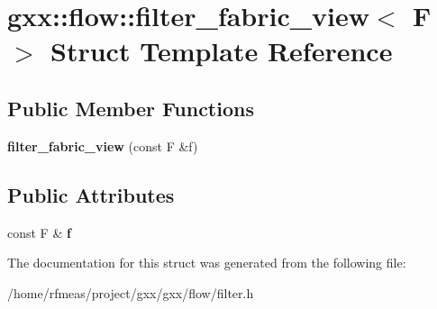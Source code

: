 \hypertarget{structgxx_1_1flow_1_1filter__fabric__view}{}\section{gxx\+:\+:flow\+:\+:filter\+\_\+fabric\+\_\+view$<$ F $>$ Struct Template Reference}
\label{structgxx_1_1flow_1_1filter__fabric__view}
\subsection*{Public Member Functions}
\begin{DoxyCompactItemize}
\item 
{\bfseries filter\+\_\+fabric\+\_\+view} (const F \&f)\hypertarget{structgxx_1_1flow_1_1filter__fabric__view_a0733665ca1f024bdfc5293baee6ce487}{}\label{structgxx_1_1flow_1_1filter__fabric__view_a0733665ca1f024bdfc5293baee6ce487}

\end{DoxyCompactItemize}
\subsection*{Public Attributes}
\begin{DoxyCompactItemize}
\item 
const F \& {\bfseries f}\hypertarget{structgxx_1_1flow_1_1filter__fabric__view_aa6a3b40d61c6814a14f09acf6982c4ee}{}\label{structgxx_1_1flow_1_1filter__fabric__view_aa6a3b40d61c6814a14f09acf6982c4ee}

\end{DoxyCompactItemize}


The documentation for this struct was generated from the following file\+:\begin{DoxyCompactItemize}
\item 
/home/rfmeas/project/gxx/gxx/flow/filter.\+h\end{DoxyCompactItemize}
